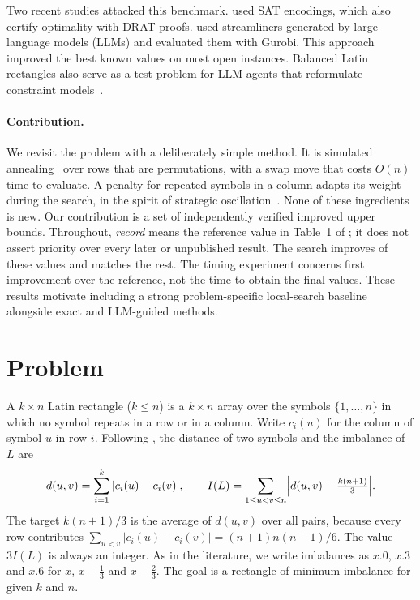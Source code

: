 \documentclass[11pt]{article}
\begin{document}
Two recent studies attacked this benchmark. \citet{RamaswamySzeider2023} used SAT encodings,
which also certify optimality with DRAT proofs. \citet{VoborilRamaswamySzeider2025} used
streamliners generated by large language models (LLMs) and evaluated them with Gurobi. This
approach improved the best known values on most open instances. Balanced Latin rectangles also
serve as a test problem for LLM agents that reformulate constraint models~\citep{VoborilSzeider2026}.

\paragraph{Contribution.} We revisit the problem with a deliberately simple method. It is
simulated annealing~\citep{KirkpatrickGelattVecchi1983} over rows that are permutations, with a
swap move that costs $O(n)$ time to evaluate. A penalty for repeated symbols in a column adapts
its weight during the search, in the spirit of strategic oscillation~\citep{GloverHao2011}. None
of these ingredients is new. Our contribution is a set of independently verified improved
upper bounds. Throughout, \emph{record} means the reference value in Table~1 of
\citet{VoborilRamaswamySzeider2025}; it does not assert priority over every later or
unpublished result. The search improves \NumImproved{} of these \NumCells{} values and
matches the rest. The timing experiment concerns first improvement over the reference,
not the time to obtain the final values. These results motivate including a strong
problem-specific local-search baseline alongside exact and LLM-guided methods.

\section{Problem}

A $k\times n$ Latin rectangle ($k\le n$) is a $k\times n$ array over the symbols
$\{1,\dots,n\}$ in which no symbol repeats in a row or in a column. Write $c_i(u)$ for the
column of symbol $u$ in row $i$. Following \citet{RamaswamySzeider2023}, the distance of two
symbols and the imbalance of $L$ are
\[
  d(u,v) = \sum_{i=1}^{k} |c_i(u)-c_i(v)|, \qquad
  I(L) = \sum_{1\le u<v\le n} \Bigl| d(u,v) - \tfrac{k(n+1)}{3} \Bigr| .
\]
The target $k(n+1)/3$ is the average of $d(u,v)$ over all pairs, because every row contributes
$\sum_{u<v}|c_i(u)-c_i(v)| = (n+1)n(n-1)/6$. The value $3I(L)$ is always an integer. As in the
literature, we write imbalances as $x.0$, $x.3$ and $x.6$ for $x$, $x+\tfrac13$ and
$x+\tfrac23$. The goal is a rectangle of minimum imbalance for given $k$ and $n$.
\end{document}

